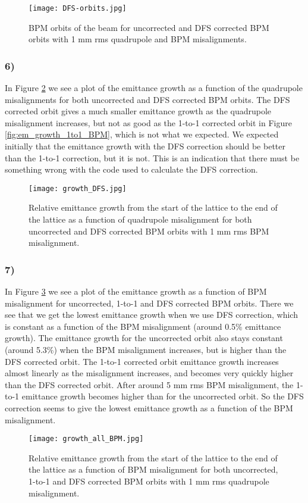 \documentclass[12pt,a4paper,english]{article}
\begin{document}
\begin{figure}[htbp!]
	\centering\texttt{[image: DFS-orbits.jpg]}
	\caption{BPM orbits of the beam for uncorrected and DFS corrected BPM orbits with 1 mm rms quadrupole and BPM misalignments. \label{fig:DFS_orbit}}
\end{figure} 

\subsubsection*{6)}
In Figure \ref{fig:em_growth_DFS} we see a plot of the emittance growth as a function of the quadrupole misalignments for both uncorrected and DFS corrected BPM orbits. The DFS corrected orbit gives a much smaller emittance growth as the quadrupole misalignment increases, but not as good as the 1-to-1 corrected orbit in Figure \ref{fig:em_growth_1to1_BPM}, which is not what we expected. We expected initially that the emittance growth with the DFS correction should be better than the 1-to-1 correction, but it is not. This is an indication that there must be something wrong with the code used to calculate the DFS correction.

\begin{figure}[htbp!]
	\centering\texttt{[image: growth\_DFS.jpg]}
	\caption{Relative emittance growth from the start of the lattice to the end of the lattice as a function of quadrupole misalignment for both uncorrected and DFS corrected BPM orbits with 1 mm rms BPM misalignment. \label{fig:em_growth_DFS}}
\end{figure} 

\subsubsection*{7)}
In Figure \ref{fig:em_growth_all} we see a plot of the emittance growth as a function of BPM misalignment for uncorrected, 1-to-1 and DFS corrected BPM orbits. There we see that we get the lowest emittance growth when we use DFS correction, which is constant as a function of the BPM misalignment (around 0.5\% emittance growth). The emittance growth for the uncorrected orbit also stays constant (around 5.3\%) when the BPM misalignment increases, but is higher than the DFS corrected orbit. The 1-to-1 corrected orbit emittance growth increases almost linearly as the misalignment increases, and becomes very quickly higher than the DFS corrected orbit. After around 5 mm rms BPM misalignment, the 1-to-1 emittance growth becomes higher than for the uncorrected orbit. So the DFS correction seems to give the lowest emittance growth as a function of the BPM misalignment.

\begin{figure}[htbp!]
	\centering\texttt{[image: growth\_all\_BPM.jpg]}
	\caption{Relative emittance growth from the start of the lattice to the end of the lattice as a function of BPM misalignment for both uncorrected, 1-to-1 and DFS corrected BPM orbits with 1 mm rms quadrupole misalignment. \label{fig:em_growth_all}}
\end{figure} 
\end{document}
